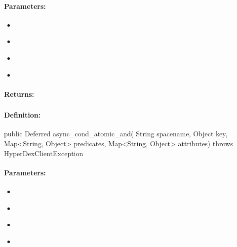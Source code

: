 \paragraph{Parameters:}
\begin{itemize}[noitemsep]
\item {}\\

\item {}\\

\item {}\\

\item {}\\

\end{itemize}

\paragraph{Returns:}


\pagebreak
\subsubsection{}
\label{api:java:async_cond_atomic_and}


\paragraph{Definition:}
\begin{javacode}
public Deferred async_cond_atomic_and(
        String spacename,
        Object key,
        Map<String, Object> predicates,
        Map<String, Object> attributes) throws HyperDexClientException
\end{javacode}

\paragraph{Parameters:}
\begin{itemize}[noitemsep]
\item {}\\

\item {}\\

\item {}\\

\item {}\\

\end{itemize}

